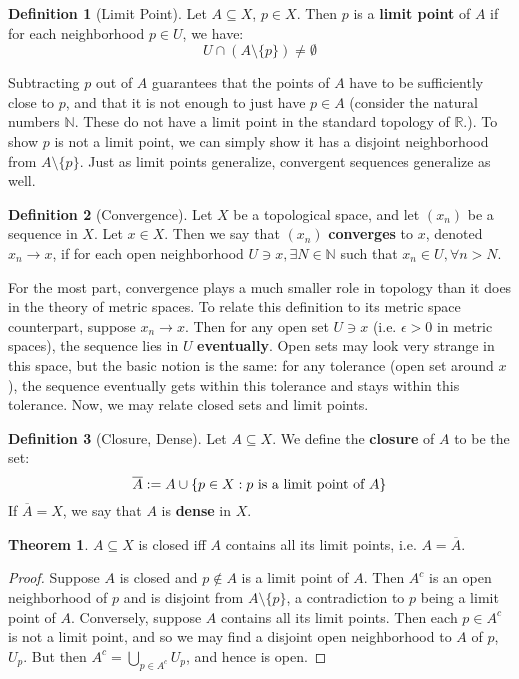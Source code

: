 \documentclass[11pt, oneside]{amsart}   	%
\theoremstyle{definition}
\newtheorem{definition}{Definition}[section]
\newtheorem{theorem}{Theorem}[section]
\begin{document}
	\begin{definition}[Limit Point]
		Let $A\subseteq X$, $p\in X$. Then $p$ is a \textbf{limit point} of $A$ if for each neighborhood $p\in U$, we have:
		$$
			U\cap(A\setminus\{p\})\neq\emptyset
		$$
	\end{definition}
	
	Subtracting $p$ out of $A$ guarantees that the points of $A$ have to be sufficiently close to $p$, and that it is not enough to just have $p\in A$ (consider 
	the natural numbers $\mathbb N$. These do not have a limit point in the standard topology of $\mathbb R$.). To show $p$ is not a limit point, we can 
	simply show it has a disjoint neighborhood from $A\setminus\{p\}$. Just as limit points generalize, convergent sequences generalize as well.
	
	\begin{definition}[Convergence]
		Let $X$ be a topological space, and let $(x_n)$ be a sequence in $X$. Let $x\in X$. Then we say that $(x_n)$ \textbf{converges} to $x$, denoted $x_n
		\rightarrow x$, if for each open neighborhood $U\ni x, \exists N\in\mathbb N$ such that $x_n\in U, \forall n > N$.
	\end{definition}
	
	For the most part, convergence plays a much smaller role in topology than it does in the theory of metric spaces. To relate this definition to its metric space 
	counterpart, suppose $x_n\rightarrow x$. Then for any open set $U\ni x$ (i.e. $\epsilon > 0$ in metric spaces), the sequence lies in $U$ \textbf{eventually}. 
	Open sets may look very strange in this space, but the basic notion is the same: for any tolerance (open set around $x$), the sequence eventually gets within 
	this tolerance and stays within this tolerance. Now, we may relate closed sets and limit points.
	
	\begin{definition}[Closure, Dense]
		Let $A\subseteq X$. We define the \textbf{closure} of $A$ to be the set:
		$$
			\overline A := A\cup\{p\in X : p \textnormal{ is a limit point of $A$}\}
		$$
		If $\overline A = X$, we say that $A$ is \textbf{dense} in $X$.
	\end{definition}
	
	\begin{theorem}
		$A\subseteq X$ is closed iff $A$ contains all its limit points, i.e. $A = \overline A$.
	\end{theorem}
	
	\begin{proof}
		Suppose $A$ is closed and $p\notin A$ is a limit point of $A$. Then $A^c$ is an open neighborhood of $p$ and is disjoint from $A\setminus\{p\}$, a 
		contradiction to $p$ being a limit point of $A$. Conversely, suppose $A$ contains all its limit points. Then each $p\in A^c$ is not a limit point, and so 
		we may find a disjoint open neighborhood to $A$ of $p$, $U_p$. But then $A^c = \bigcup_{p\in A^c} U_p$, and hence is open.
	\end{proof}
	
\end{document}
